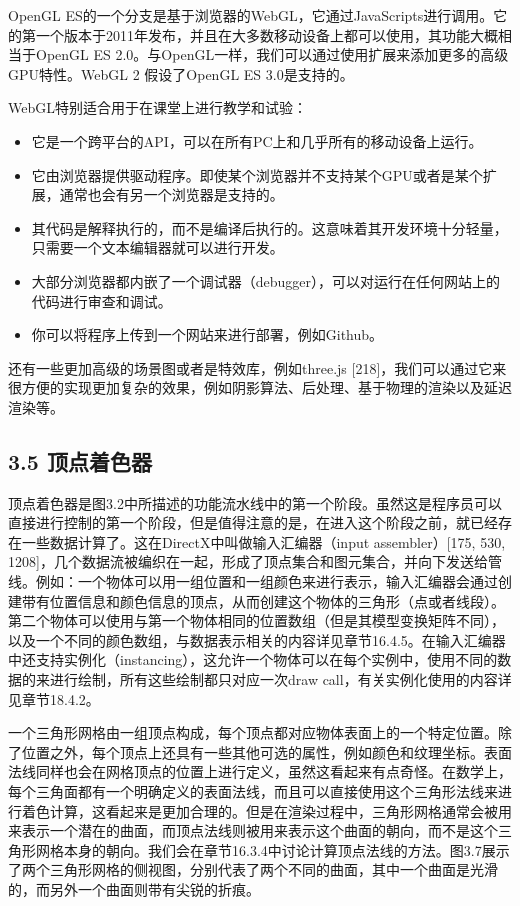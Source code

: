 \documentclass[
  paper=a4,
  ,captions=tableheading
]{scrartcl}
\providecommand{\tightlist}{%
  \setlength{\itemsep}{0pt}\setlength{\parskip}{0pt}}
\begin{document}
OpenGL
ES的一个分支是基于浏览器的WebGL，它通过JavaScripts进行调用。它的第一个版本于2011年发布，并且在大多数移动设备上都可以使用，其功能大概相当于OpenGL
ES 2.0。与OpenGL一样，我们可以通过使用扩展来添加更多的高级GPU特性。WebGL
2 假设了OpenGL ES 3.0是支持的。

WebGL特别适合用于在课堂上进行教学和试验：

\begin{itemize}
\tightlist
\item
  它是一个跨平台的API，可以在所有PC上和几乎所有的移动设备上运行。
\item
  它由浏览器提供驱动程序。即使某个浏览器并不支持某个GPU或者是某个扩展，通常也会有另一个浏览器是支持的。
\item
  其代码是解释执行的，而不是编译后执行的。这意味着其开发环境十分轻量，只需要一个文本编辑器就可以进行开发。
\item
  大部分浏览器都内嵌了一个调试器（debugger），可以对运行在任何网站上的代码进行审查和调试。
\item
  你可以将程序上传到一个网站来进行部署，例如Github。
\end{itemize}

还有一些更加高级的场景图或者是特效库，例如three.js
{[}218{]}，我们可以通过它来很方便的实现更加复杂的效果，例如阴影算法、后处理、基于物理的渲染以及延迟渲染等。

\subsection{3.5 顶点着色器}\label{ux9876ux70b9ux7740ux8272ux5668}

顶点着色器是图3.2中所描述的功能流水线中的第一个阶段。虽然这是程序员可以直接进行控制的第一个阶段，但是值得注意的是，在进入这个阶段之前，就已经存在一些数据计算了。这在DirectX中叫做输入汇编器（input
assembler）{[}175, 530,
1208{]}，几个数据流被编织在一起，形成了顶点集合和图元集合，并向下发送给管线。例如：一个物体可以用一组位置和一组颜色来进行表示，输入汇编器会通过创建带有位置信息和颜色信息的顶点，从而创建这个物体的三角形（点或者线段）。第二个物体可以使用与第一个物体相同的位置数组（但是其模型变换矩阵不同），以及一个不同的颜色数组，与数据表示相关的内容详见章节16.4.5。在输入汇编器中还支持实例化（instancing），这允许一个物体可以在每个实例中，使用不同的数据的来进行绘制，所有这些绘制都只对应一次draw
call，有关实例化使用的内容详见章节18.4.2。

一个三角形网格由一组顶点构成，每个顶点都对应物体表面上的一个特定位置。除了位置之外，每个顶点上还具有一些其他可选的属性，例如颜色和纹理坐标。表面法线同样也会在网格顶点的位置上进行定义，虽然这看起来有点奇怪。在数学上，每个三角面都有一个明确定义的表面法线，而且可以直接使用这个三角形法线来进行着色计算，这看起来是更加合理的。但是在渲染过程中，三角形网格通常会被用来表示一个潜在的曲面，而顶点法线则被用来表示这个曲面的朝向，而不是这个三角形网格本身的朝向。我们会在章节16.3.4中讨论计算顶点法线的方法。图3.7展示了两个三角形网格的侧视图，分别代表了两个不同的曲面，其中一个曲面是光滑的，而另外一个曲面则带有尖锐的折痕。
\end{document}
